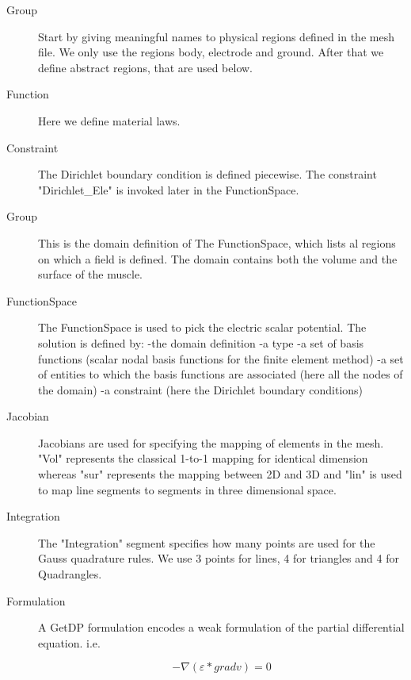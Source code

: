 \documentclass[preprint,journal]{vgtc}       %
\begin{document}
\begin{description}
	\item[Group]
	Start by giving meaningful names to physical regions defined in the mesh file.
	We only use the regions body, electrode and ground. 
	After that we define abstract regions, that are used below.
	\item[Function]
	Here we define material laws.
	\item[Constraint]
	The Dirichlet boundary condition is defined piecewise. 
	The constraint "Dirichlet\_Ele" is invoked later in the FunctionSpace.
	\item[Group]
	This is the domain definition of The FunctionSpace, which lists al regions on which a field is defined. 
	The domain contains both the volume and the surface of the muscle.
	\item[FunctionSpace]
	The FunctionSpace is used to pick the electric scalar potential. 
	The solution is defined  by:\newline
	-the domain definition\newline
	-a type\newline
	-a set of basis functions (scalar nodal basis functions for the finite element method)\newline 
	-a set of entities to which the basis functions are associated (here all the nodes of the domain)\newline
	-a constraint (here the Dirichlet boundary conditions)
	
	\item[Jacobian] 
	Jacobians are used for specifying the mapping of elements in the mesh.
	"Vol" represents the classical 1-to-1 mapping for identical dimension whereas "sur" represents the mapping between 2D and 3D and "lin" is used to map line segments to segments in three dimensional space.
	
	\item[Integration]
	The "Integration" segment specifies how many points are used for the Gauss quadrature rules. 
	We use 3 points for lines, 4 for triangles and 4 for Quadrangles.
	
	\item[Formulation]
	A GetDP formulation encodes a weak formulation of the partial differential equation. i.e. 
	
	
	\[-\nabla (\varepsilon *\mathrel{grad} v) = 0\]
	

\end{description}
\end{document}
